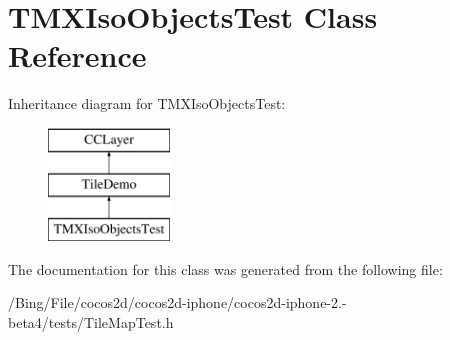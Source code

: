 \hypertarget{interface_t_m_x_iso_objects_test}{\section{T\-M\-X\-Iso\-Objects\-Test Class Reference}
\label{interface_t_m_x_iso_objects_test}
}
Inheritance diagram for T\-M\-X\-Iso\-Objects\-Test\-:\begin{figure}[H]
\begin{center}
\leavevmode
\includegraphics[height=3.000000cm]{interface_t_m_x_iso_objects_test}
\end{center}
\end{figure}


The documentation for this class was generated from the following file\-:\begin{DoxyCompactItemize}
\item 
/\-Bing/\-File/cocos2d/cocos2d-\/iphone/cocos2d-\/iphone-\/2.-\/beta4/tests/Tile\-Map\-Test.\-h\end{DoxyCompactItemize}
